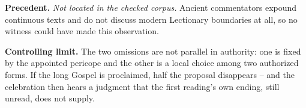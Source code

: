 \textbf{Precedent.} \emph{Not located in the checked corpus.} Ancient commentators expound continuous texts and do not discuss modern Lectionary boundaries at all, so no witness could have made this observation.

\textbf{Controlling limit.} The two omissions are not parallel in authority: one is fixed by the appointed pericope and the other is a local choice among two authorized forms. If the long Gospel is proclaimed, half the proposal disappears -- and the celebration then hears a judgment that the first reading's own ending, still unread, does not supply.
